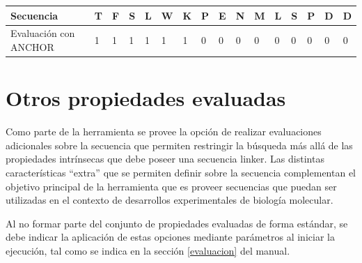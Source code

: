 \vspace{0.2cm}
\begin{center}
\begin{adjustbox}{width=\textwidth}
\begin{tabular}{llllllllllllllll} 
\hline      
Secuencia & \textbf{T} & \textbf{F} & \textbf{S} & \textbf{L} & \textbf{W} & \textbf{K} & \textbf{P} & \textbf{E} & \textbf{N} & \textbf{M} & \textbf{L} & \textbf{S} & \textbf{P} & \textbf{D} & \textbf{D} \\ \hline
Evaluación con ANCHOR & 1 & 1 & 1 & 1 & 1 & 1 & 0 & 0 & 0 & 0 & 0 & 0 & 0 & 0 & 0\\ \hline
\end{tabular}
\end{adjustbox}
\end{center}

























\section{Otros propiedades evaluadas}

Como parte de la herramienta se provee la opción de realizar evaluaciones adicionales sobre la secuencia que permiten restringir la búsqueda más allá de las propiedades intrínsecas que debe poseer una secuencia linker.
Las distintas características ``extra'' que se permiten definir sobre la secuencia complementan el objetivo principal de la herramienta que es proveer secuencias que puedan ser utilizadas 
en el contexto de desarrollos experimentales de biología molecular.

Al no formar parte del conjunto de propiedades evaluadas de forma estándar, se debe indicar la aplicación de estas opciones mediante parámetros al iniciar la ejecución, tal como se indica en la sección \ref{evaluacion} del manual.

